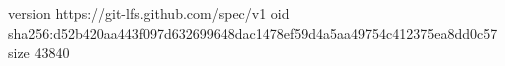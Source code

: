 version https://git-lfs.github.com/spec/v1
oid sha256:d52b420aa443f097d632699648dac1478ef59d4a5aa49754c412375ea8dd0c57
size 43840
